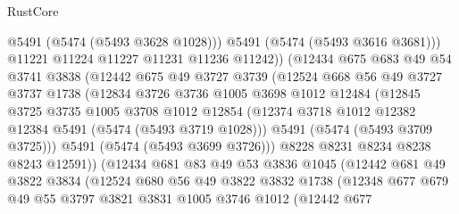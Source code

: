 \begin{lexlean}{RustCore}
\begin{coremodule}
                        @5491
                        (@5474 (@5493 @3628 @1028)))
                      @5491
                      (@5474 (@5493 @3616 @3681)))
                    @11221
                    @11224
                    @11227
                    @11231
                    @11236
                    @11242))
                (@12434
                  @675
                  @683
                  @49
                  @54
                  @3741
                  @3838
                  (@12442
                    @675
                    @49
                    @3727
                    @3739
                    (@12524
                      @668
                      @56
                      @49
                      @3727
                      @3737
                      @1738
                      (@12834
                        @3726
                        @3736
                        @1005
                        @3698
                        @1012
                        @12484
                        (@12845
                          @3725
                          @3735
                          @1005
                          @3708
                          @1012
                          @12854
                          (@12374 @3718 @1012 @12382 @12384 @5491 (@5474 (@5493 @3719 @1028)))
                          @5491
                          (@5474 (@5493 @3709 @3725)))
                        @5491
                        (@5474 (@5493 @3699 @3726)))
                      @8228
                      @8231
                      @8234
                      @8238
                      @8243
                      @12591))
                  (@12434
                    @681
                    @83
                    @49
                    @53
                    @3836
                    @1045
                    (@12442
                      @681
                      @49
                      @3822
                      @3834
                      (@12524
                        @680
                        @56
                        @49
                        @3822
                        @3832
                        @1738
                        (@12348
                          @677
                          @679
                          @49
                          @55
                          @3797
                          @3821
                          @3831
                          @1005
                          @3746
                          @1012
                          (@12442
                            @677

\end{coremodule}
\end{lexlean}
